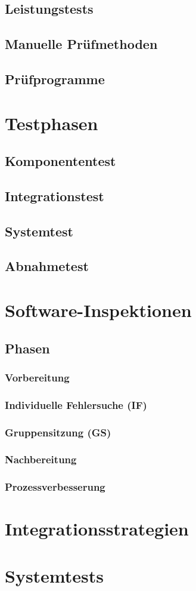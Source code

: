 \documentclass[a4paper]{article}
\theoremstyle{break}
\begin{document}
\subsection{Leistungstests}
\subsection{Manuelle Prüfmethoden}
\subsection{Prüfprogramme}
\section{Testphasen}
\subsection{Komponententest}
\subsection{Integrationstest}
\subsection{Systemtest}
\subsection{Abnahmetest}
\section{Software-Inspektionen}
\subsection{Phasen}
\subsubsection{Vorbereitung}
\subsubsection{Individuelle Fehlersuche (IF)}
\subsubsection{Gruppensitzung (GS)}
\subsubsection{Nachbereitung}
\subsubsection{Prozessverbesserung}
\section{Integrationsstrategien}
\section{Systemtests}
\end{document}
